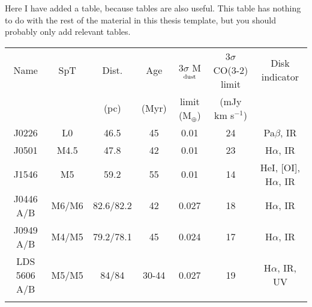 Here I have added a table, because tables are also useful. This table has nothing to do with the rest of the material in this thesis template, but you should probably only add relevant tables.
\begin{table}[tbh]
\begin{center}
\begin{tabular}{ccccccc}
\hline \noalign {\smallskip}
Name & SpT & Dist. & Age & 3$\sigma$ M$_{\rm dust}$ & 3$\sigma$ CO(3-2) limit & Disk indicator \\
 & & (pc) & (Myr) & limit (M$_{\oplus}$) &  (mJy km s$^{-1}$)\\
\hline \noalign {\smallskip}
J0226 & L0 & 46.5 & 45 & 0.01 & 24 & Pa$\beta$, IR\\
J0501 & M4.5 & 47.8 & 42 & 0.01 & 23 & H$\alpha$, IR\\
J1546 & M5 & 59.2 & 55 & 0.01 & 14 & HeI, [OI], H$\alpha$, IR\\
J0446 A/B & M6/M6 & 82.6/82.2 & 42 &  0.027 & 18 & H$\alpha$, IR\\
J0949 A/B & M4/M5 & 79.2/78.1 & 45 &  0.024 & 17 & H$\alpha$, IR\\
LDS 5606 A/B & M5/M5 & 84/84 & 30-44 & 0.027 & 19 & H$\alpha$, IR, UV\\
\hline \noalign {\smallskip}
\end{tabular}
\end{center}
\end{table}


